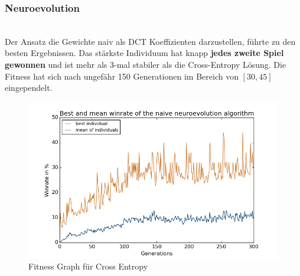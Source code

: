             \subsubsection*{Neuroevolution}
                \begin{multicols}{2}
                    \noindent
                    \\[5mm]
                    Der Ansatz die Gewichte naiv als DCT Koeffizienten darzustellen, führte zu den besten Ergebnissen. Das stärkste Individuum hat knapp \textbf{jedes zweite Spiel gewonnen} und ist mehr als 3-mal stabiler als die Cross-Entropy Lösung. Die Fitness hat sich nach ungefähr 150 Generationen im Bereich von $[30,45]$ eingependelt.
                    \begin{figure}[H]
                       \includegraphics[scale=0.5]{../pictures/summary/neural-fitness.png}
                       \caption{Fitness Graph für Cross Entropy}\label{fig:graph-ne}
                    \end{figure}
                \end{multicols}

